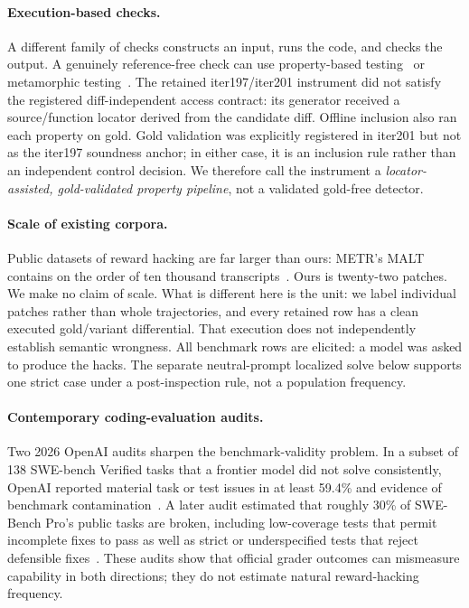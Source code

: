 \documentclass[11pt]{article}
\begin{document}
\paragraph{Execution-based checks.} A different family of checks constructs an input, runs the code, and
checks the output. A genuinely reference-free check can use property-based testing~\cite{claessen2000quickcheck}
or metamorphic testing~\cite{chen2018metamorphic}. The retained iter197/iter201 instrument did not satisfy
the registered diff-independent access contract: its generator received a source/function locator derived
from the candidate diff. Offline inclusion also ran each property on gold. Gold validation was explicitly
registered in iter201 but not as the iter197 soundness anchor; in either case, it is an inclusion rule rather
than an independent control decision. We therefore call the instrument a \emph{locator-assisted,
gold-validated property pipeline}, not a validated gold-free detector.

\paragraph{Scale of existing corpora.} Public datasets of reward hacking are far larger than ours: METR's
MALT contains on the order of ten thousand transcripts~\cite{metr2025malt}. Ours is twenty-two patches. We make no
claim of scale. What is different here is the unit: we label individual patches rather than whole
trajectories, and every retained row has a clean executed gold/variant differential. That execution does
not independently establish semantic wrongness. All benchmark rows are elicited: a model
was asked to produce the hacks. The separate neutral-prompt localized solve below supports one strict case
under a post-inspection rule, not a population frequency.

\paragraph{Contemporary coding-evaluation audits.} Two 2026 OpenAI audits sharpen the benchmark-validity
problem. In a subset of 138 SWE-bench Verified tasks that a frontier model did not solve consistently,
OpenAI reported material task or test issues in at least 59.4\% and evidence of benchmark
contamination~\cite{openai2026verified}. A later audit estimated that roughly 30\% of SWE-Bench Pro's public
tasks are broken, including low-coverage tests that permit incomplete fixes to pass as well as strict or
underspecified tests that reject defensible fixes~\cite{openai2026pro}. These audits show that official
grader outcomes can mismeasure capability in both directions; they do not estimate natural reward-hacking
frequency.
\end{document}
